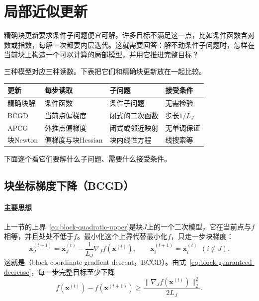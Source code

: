 \section{局部近似更新}
\label{sec:block-local}

精确块更新要求条件子问题便宜可解。许多目标不满足这一点，比如条件函数含对数或指数，每解一次都要内层迭代。这就需要回答：解不动条件子问题时，怎样在当前块上构造一个可以计算的局部模型，并用它推进完整目标？

三种模型对应三种读数。下表把它们和精确块更新放在一起比较。

\begin{BookInlineTable}
\centering
\begin{tabular}{p{20mm}p{24mm}p{22mm}p{22mm}}
\toprule
更新 & 每步读取 & 子问题 & 接受条件\\
\midrule
精确块解 & 条件函数 & 条件子问题 & 无需检验\\
BCGD & 当前点偏梯度 & 闭式的二次函数 & 步长$1/L_J$\\
APCG & 外推点偏梯度 & 闭式或邻近映射 & 无单调保证\\
块Newton & 偏梯度与块Hessian & 块内线性方程 & 线搜索等\\
\bottomrule
\end{tabular}
\end{BookInlineTable}

下面逐个看它们要解什么子问题、需要什么接受条件。

\subsection{块坐标梯度下降（BCGD）}
\label{sec:block-bcgd}

\paragraph{主要思想}
上一节的上界~\eqref{eq:block-quadratic-upper}是块$J$上的一个二次模型，它在当前点与$f$相等，并且处处不低于$f$。最小化这个上界代替最小化$f$，只走一步块梯度：
\begin{equation}
 \bm{x}_J^{(t+1)}=\bm{x}_J^{(t)}-\frac{1}{L_J}\nabla_Jf(\bm{x}^{(t)}),\qquad
 \bm{x}_i^{(t+1)}=\bm{x}_i^{(t)}\ \ (i\notin J).
 \label{eq:block-bcgd}
\end{equation}
这就是（block coordinate gradient descent，BCGD）。由式~\eqref{eq:block-guaranteed-decrease}，每一步完整目标至少下降
\begin{equation}
 f(\bm{x}^{(t)})-f(\bm{x}^{(t+1)})\geq\frac{\lVert\nabla_Jf(\bm{x}^{(t)})\rVert_2^2}{2L_J}.
 \label{eq:block-bcgd-decrease}
\end{equation}

